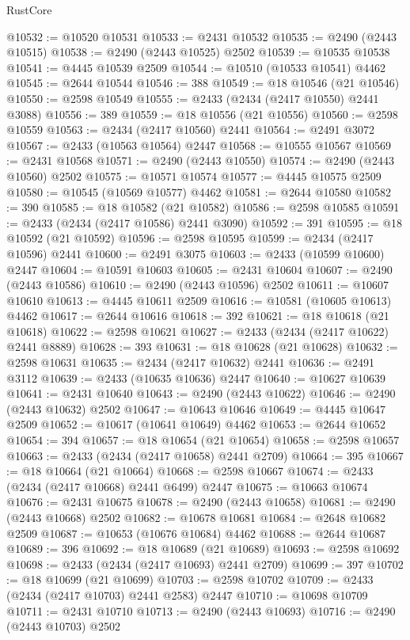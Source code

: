 \begin{lexlean}{RustCore}
\begin{coremodule}
@10532 := @10520 @10531
@10533 := @2431 @10532
@10535 := @2490 (@2443 @10515)
@10538 := @2490 (@2443 @10525) @2502
@10539 := @10535 @10538
@10541 := @4445 @10539 @2509
@10544 := @10510 (@10533 @10541) @4462
@10545 := @2644 @10544
@10546 := 388
@10549 := @18 @10546 (@21 @10546)
@10550 := @2598 @10549
@10555 := @2433 (@2434 (@2417 @10550) @2441 @3088)
@10556 := 389
@10559 := @18 @10556 (@21 @10556)
@10560 := @2598 @10559
@10563 := @2434 (@2417 @10560) @2441
@10564 := @2491 @3072
@10567 := @2433 (@10563 @10564) @2447
@10568 := @10555 @10567
@10569 := @2431 @10568
@10571 := @2490 (@2443 @10550)
@10574 := @2490 (@2443 @10560) @2502
@10575 := @10571 @10574
@10577 := @4445 @10575 @2509
@10580 := @10545 (@10569 @10577) @4462
@10581 := @2644 @10580
@10582 := 390
@10585 := @18 @10582 (@21 @10582)
@10586 := @2598 @10585
@10591 := @2433 (@2434 (@2417 @10586) @2441 @3090)
@10592 := 391
@10595 := @18 @10592 (@21 @10592)
@10596 := @2598 @10595
@10599 := @2434 (@2417 @10596) @2441
@10600 := @2491 @3075
@10603 := @2433 (@10599 @10600) @2447
@10604 := @10591 @10603
@10605 := @2431 @10604
@10607 := @2490 (@2443 @10586)
@10610 := @2490 (@2443 @10596) @2502
@10611 := @10607 @10610
@10613 := @4445 @10611 @2509
@10616 := @10581 (@10605 @10613) @4462
@10617 := @2644 @10616
@10618 := 392
@10621 := @18 @10618 (@21 @10618)
@10622 := @2598 @10621
@10627 := @2433 (@2434 (@2417 @10622) @2441 @8889)
@10628 := 393
@10631 := @18 @10628 (@21 @10628)
@10632 := @2598 @10631
@10635 := @2434 (@2417 @10632) @2441
@10636 := @2491 @3112
@10639 := @2433 (@10635 @10636) @2447
@10640 := @10627 @10639
@10641 := @2431 @10640
@10643 := @2490 (@2443 @10622)
@10646 := @2490 (@2443 @10632) @2502
@10647 := @10643 @10646
@10649 := @4445 @10647 @2509
@10652 := @10617 (@10641 @10649) @4462
@10653 := @2644 @10652
@10654 := 394
@10657 := @18 @10654 (@21 @10654)
@10658 := @2598 @10657
@10663 := @2433 (@2434 (@2417 @10658) @2441 @2709)
@10664 := 395
@10667 := @18 @10664 (@21 @10664)
@10668 := @2598 @10667
@10674 := @2433 (@2434 (@2417 @10668) @2441 @6499) @2447
@10675 := @10663 @10674
@10676 := @2431 @10675
@10678 := @2490 (@2443 @10658)
@10681 := @2490 (@2443 @10668) @2502
@10682 := @10678 @10681
@10684 := @2648 @10682 @2509
@10687 := @10653 (@10676 @10684) @4462
@10688 := @2644 @10687
@10689 := 396
@10692 := @18 @10689 (@21 @10689)
@10693 := @2598 @10692
@10698 := @2433 (@2434 (@2417 @10693) @2441 @2709)
@10699 := 397
@10702 := @18 @10699 (@21 @10699)
@10703 := @2598 @10702
@10709 := @2433 (@2434 (@2417 @10703) @2441 @2583) @2447
@10710 := @10698 @10709
@10711 := @2431 @10710
@10713 := @2490 (@2443 @10693)
@10716 := @2490 (@2443 @10703) @2502

\end{coremodule}
\end{lexlean}
